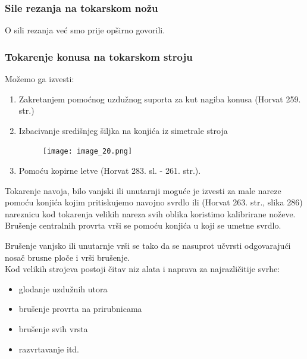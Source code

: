 \documentclass[a4paper,12pt]{article}
\numberwithin{figure}{section}
\begin{document}
\subsubsection{Sile rezanja na tokarskom nožu}
O sili rezanja već smo prije opširno govorili.
\subsubsection{Tokarenje konusa na tokarskom stroju}
Možemo ga izvesti:
\begin{enumerate}
\item Zakretanjem pomoćnog uzdužnog suporta za kut nagiba konusa (Horvat 259. str.)
\item Izbacivanje središnjeg šiljka na konjića iz simetrale stroja
\begin{figure}[!h]
\centering
\texttt{[image: image\_20.png]}
\end{figure}
\FloatBarrier
\item Pomoću kopirne letve (Horvat 283. sl. - 261. str.).
\end{enumerate}
Tokarenje navoja, bilo vanjski ili unutarnji moguće je izvesti za male nareze pomoću konjića kojim pritiskujemo navojno svrdlo ili (Horvat 263. str., slika 286) nareznicu kod tokarenja velikih nareza svih oblika koristimo kalibrirane noževe.\\
Brušenje centralnih provrta vrši se pomoću konjića u koji se umetne svrdlo.\par
Brušenje vanjsko ili unutarnje vrši se tako da se nasuprot učvrsti odgovarajući nosač brusne ploče i vrši brušenje.\\
Kod velikih strojeva postoji čitav niz alata i naprava za najrazličitije svrhe:
\begin{itemize}
\item glodanje uzdužnih utora
\item brušenje provrta na prirubnicama
\item brušenje svih vrsta
\item razvrtavanje itd.
\end{itemize}
\end{document}

